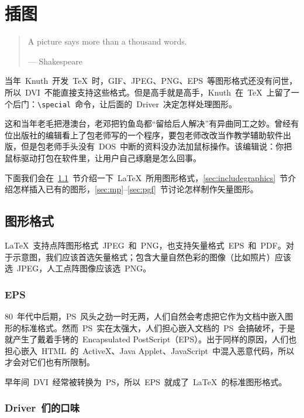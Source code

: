 \chapter{插图}
\label{sec:graphics}

\begin{quotation}
A picture says more than a thousand words.
\begin{flushright}
--- Shakespeare
\end{flushright}
\end{quotation}

当年~Knuth~开发~\TeX~时，GIF、JPEG、PNG、EPS~等图形格式还没有问世，所以~DVI~不能直接支持这些格式。但是高手就是高手，Knuth~在~\TeX~上留了一个后门：\verb|\special|~命令，让后面的~Driver~决定怎样处理图形。

这和当年老毛把港澳台，老邓把钓鱼岛都“留给后人解决”有异曲同工之妙。曾经有位出版社的编辑看上了包老师写的一个程序，要包老师改改当作教学辅助软件出版，但是包老师手头没有~DOS~中断的资料没办法加鼠标操作。该编辑说：你把鼠标驱动打包在软件里，让用户自己琢磨是怎么回事。

下面我们会在~\ref{sec:graphics_format}~节介绍一下~\LaTeX~所用图形格式，\ref{sec:includegraphics}~节介绍怎样插入已有的图形，\ref{sec:mp}--\ref{sec:pgf}~节讨论怎样制作矢量图形。

\section{图形格式}
\label{sec:graphics_format}

\LaTeX~支持点阵图形格式~JPEG~和~PNG，也支持矢量格式~EPS~和~PDF。对于示意图，我们应该首选矢量格式；包含大量自然色彩的图像（比如照片）应该选~JPEG，人工点阵图像应该选~PNG。

\subsection{EPS}
80~年代中后期，PS~风头之劲一时无两，人们自然会考虑把它作为文档中嵌入图形的标准格式。然而~PS~实在太强大，人们担心嵌入文档的~PS~会搞破坏，于是就产生了戴着手铐的~Encapsulated PostScript（EPS）。出于同样的原因，人们也担心嵌入~HTML~的~ActiveX、Java Applet、JavaScript~中混入恶意代码，所以才会对它们也有所限制。

早年间~DVI~经常被转换为~PS，所以~EPS~就成了~\LaTeX~的标准图形格式。

\subsection{Driver~们的口味}

